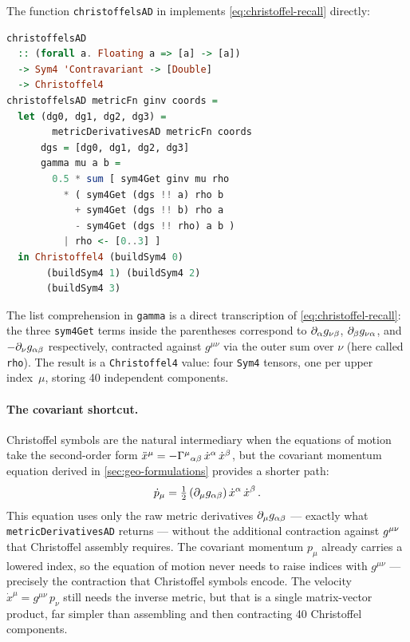 The function \texttt{christoffelsAD} in
 implements
\cref{eq:christoffel-recall} directly:
%
\begin{lstlisting}[language=Haskell]
christoffelsAD
  :: (forall a. Floating a => [a] -> [a])
  -> Sym4 'Contravariant -> [Double]
  -> Christoffel4
christoffelsAD metricFn ginv coords =
  let (dg0, dg1, dg2, dg3) =
        metricDerivativesAD metricFn coords
      dgs = [dg0, dg1, dg2, dg3]
      gamma mu a b =
        0.5 * sum [ sym4Get ginv mu rho
          * ( sym4Get (dgs !! a) rho b
            + sym4Get (dgs !! b) rho a
            - sym4Get (dgs !! rho) a b )
          | rho <- [0..3] ]
  in Christoffel4 (buildSym4 0)
       (buildSym4 1) (buildSym4 2)
       (buildSym4 3)
\end{lstlisting}
%
The list comprehension in \texttt{gamma} is a direct transcription
of \cref{eq:christoffel-recall}: the three \texttt{sym4Get} terms
inside the parentheses correspond to $\partial_{\alpha} g_{\nu\beta}$,
$\partial_{\beta} g_{\nu\alpha}$, and $-\partial_{\nu} g_{\alpha\beta}$
respectively, contracted against $g^{\mu\nu}$ via the outer sum
over $\nu$ (here called \texttt{rho}).  The result is a
\texttt{Christoffel4} value: four \texttt{Sym4} tensors, one per
upper index~$\mu$, storing 40 independent components.

\paragraph{The covariant shortcut.}

Christoffel symbols are the natural intermediary when the equations
of motion take the second-order form
$\ddot{x}^\mu
= -\Gamma^{\mu}{}_{\alpha \beta}\,
  \dot{x}^\alpha\,\dot{x}^\beta$,
but the covariant momentum equation derived in
\cref{sec:geo-formulations} provides a shorter path:
%
\begin{equation}
  \dot{p}_\mu
    = \tfrac{1}{2}\,
      (\partial_{\mu} g_{\alpha\beta})\,
      \dot{x}^\alpha\,\dot{x}^\beta \,.
  \label{eq:pdot-ad}
\end{equation}
%
This equation uses only the raw metric derivatives
$\partial_{\mu} g_{\alpha\beta}$ --- exactly what
\texttt{metricDerivativesAD} returns --- without the additional
contraction against $g^{\mu\nu}$ that Christoffel assembly
requires.  The covariant momentum $p_\mu$ already carries a
lowered index, so the equation of motion never needs to raise
indices with $g^{\mu\nu}$ --- precisely the contraction that
Christoffel symbols encode.  The velocity
$\dot{x}^\mu = g^{\mu\nu}\,p_\nu$ still needs the inverse
metric, but that is a single matrix-vector product, far simpler
than assembling and then contracting 40 Christoffel components.

